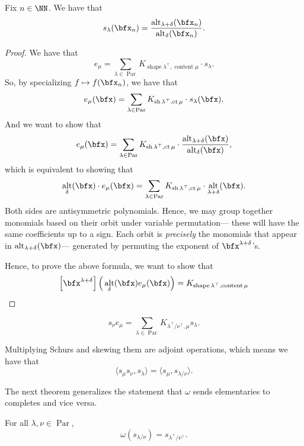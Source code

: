 \documentclass{article}
\DeclareMathOperator{\shape}{shape}
\DeclareMathOperator{\sh}{sh}
\DeclareMathOperator{\content}{content}
\DeclareMathOperator{\ct}{ct}
\DeclareMathOperator{\Par}{Par}
\DeclareMathOperator{\alt}{alt}
\begin{document}
\begin{theorem}
    Fix $n \in \NN$.
    We have that
    \[
        s_\lambda(\bfx_n) 
        = 
        \frac{\alt_{\lambda + \delta}(\bfx_n)}{\alt_\delta(\bfx_n)}.
    \]
\end{theorem}

\begin{proof}
    We have that
    \[
        e_\mu = \sum_{\lambda \in \Par} K_{\shape\lambda^\top,\content\mu} \cdot s_\lambda.
    \]
    So, by specializing $f \mapsto f(\bfx_n)$, we have that
    \[
        e_\mu(\bfx) 
        = 
        \sum_{\lambda \in \Par} 
        K_{\sh\lambda^\top,\ct\mu} \cdot s_\lambda(\bfx).
    \]
    And we want to show that
    \[
        e_\mu(\bfx) 
        = 
        \sum_{\lambda \in \Par} 
        K_{\sh\lambda^\top,\ct\mu} 
        \cdot 
        \frac{\alt_{\lambda+\delta}(\bfx)}{\alt_\delta(\bfx)},
    \]
    which is equivalent to showing that
    \[
        \alt_\delta(\bfx) \cdot e_\mu(\bfx) 
        = 
        \sum_{\lambda \in \Par} K_{\sh\lambda^\top,\ct\mu} \cdot \alt_{\lambda+\delta}(\bfx).
    \]
    Both sides are antisymmetric polynomials.
    Hence, we may group together monomials based on their orbit under variable permutation--- these will have the same coefficients up to a sign.
    Each orbit is \textit{precisely} the monomials that appear in $\alt_{\lambda+\delta}(\bfx)$--- generated by permuting the exponent of $\bfx^{\lambda+\delta}$'s.

    Hence, to prove the above formula, we want to show that 
    \[
    \left[\bfx^{\lambda+\delta}\right] 
    \Big(
        \alt_\delta (\bfx) e_\mu(\bfx)
    \Big) 
    = 
    K_{\shape \lambda^\top, \content \mu}
    \]
\end{proof}

\begin{corollary}
    \[
        s_\nu e_\mu = \sum_{\lambda\in\Par}K_{\lambda^\top/\nu^\top,\mu} s_\lambda.
    \]
\end{corollary}


\begin{theorem}
    Multiplying Schurs and skewing them are adjoint operations, which means we have that
    \[
        \langle s_\mu s_\nu, s_\lambda \rangle
        =
        \langle s_\mu, s_{\lambda/\nu} \rangle.
    \]
\end{theorem}

The next theorem generalizes the statement that $\omega$ sends elementaries to completes and vice versa.

\begin{theorem}
    For all $\lambda,\nu \in \Par$,
    \[
        \omega(s_{\lambda/\nu}) = s_{\lambda^\top/\nu^\top}.
    \]
\end{theorem}
\end{document}
